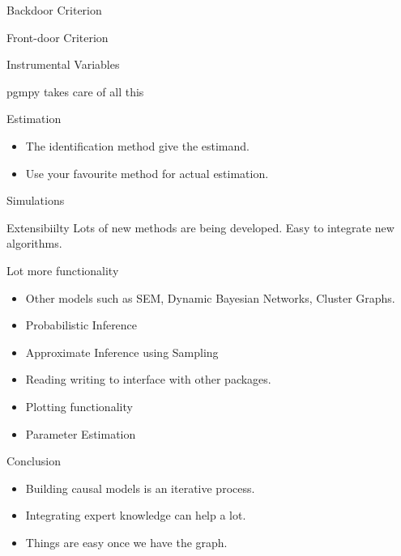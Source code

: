 \documentclass{beamer}
\begin{document}
\begin{frame}{Backdoor Criterion}
\end{frame}

\begin{frame}{Front-door Criterion}
\end{frame}

\begin{frame}{Instrumental Variables}
\end{frame}

\begin{frame}{pgmpy takes care of all this}
\end{frame}

\begin{frame}{Estimation}
	\begin{itemize}
		\item The identification method give the estimand.
		\item Use your favourite method for actual estimation.
	\end{itemize}
\end{frame}

\begin{frame}{Simulations}
\end{frame}

\begin{frame}{Extensibiilty}
	Lots of new methods are being developed.
	Easy to integrate new algorithms.
\end{frame}

\begin{frame}{Lot more functionality}
	\begin{itemize}
		\item Other models such as SEM, Dynamic Bayesian Networks, Cluster Graphs.
		\item Probabilistic Inference
		\item Approximate Inference using Sampling
		\item Reading writing to interface with other packages.
		\item Plotting functionality
		\item Parameter Estimation
	\end{itemize}
\end{frame}

\begin{frame}{Conclusion}
	\begin{itemize}
		\item Building causal models is an iterative process.
		\item Integrating expert knowledge can help a lot.
		\item Things are easy once we have the graph.
	\end{itemize}
\end{frame}
\end{document}

